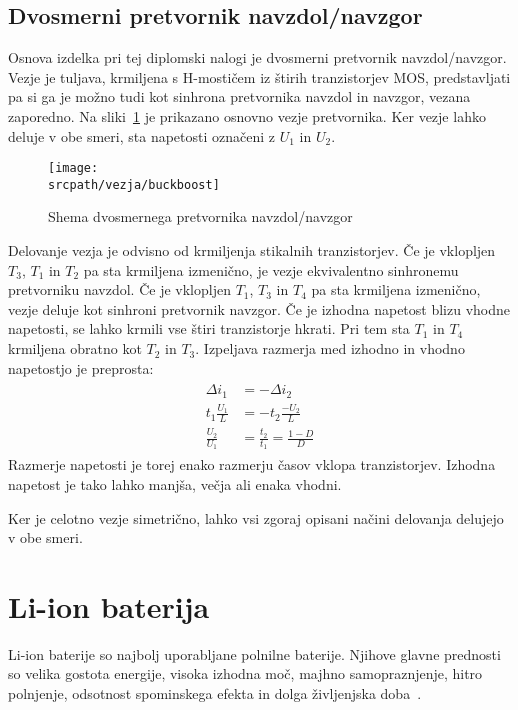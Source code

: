 \documentclass[a4paper,twoside,openright,12pt,slovene]{book}
\newcommand{\srcpath}{res_dark}
\newcommand{\srcpath}{res}
\begin{document}
\section{Dvosmerni pretvornik navzdol/navzgor} \label{sec:dvosmerni_pretvornik_navzdol_navzgor}
Osnova izdelka pri tej diplomski nalogi je dvosmerni pretvornik navzdol/navzgor.
Vezje je tuljava, krmiljena s H-mostičem iz štirih tranzistorjev MOS,
predstavljati pa si ga je možno tudi kot sinhrona pretvornika navzdol in navzgor, vezana zaporedno.
Na sliki~\ref{fig:osnovno_vezje_pretvornika} je prikazano osnovno vezje pretvornika.
Ker vezje lahko deluje v obe smeri, sta napetosti označeni z $U_1$ in $U_2$.
\begin{figure}[H]
    \centering
    \texttt{[image: \\srcpath/vezja/buckboost]}
    \caption{\label{fig:osnovno_vezje_pretvornika} Shema dvosmernega pretvornika navzdol/navzgor}
\end{figure}

Delovanje vezja je odvisno od krmiljenja stikalnih tranzistorjev.
Če je vklopljen $T_3$, $T_1$ in $T_2$ pa sta krmiljena izmenično, je vezje ekvivalentno sinhronemu pretvorniku navzdol.
Če je vklopljen $T_1$, $T_3$ in $T_4$ pa sta krmiljena izmenično, vezje deluje kot sinhroni pretvornik navzgor.
Če je izhodna napetost blizu vhodne napetosti, se lahko krmili vse štiri tranzistorje hkrati.
Pri tem sta $T_1$ in $T_4$ krmiljena obratno kot $T_2$ in $T_3$.
Izpeljava razmerja med izhodno in vhodno napetostjo je preprosta:
\begin{align}
    \begin{split}
        \Delta i_1 & = -\Delta i_2 \\
        t_1 \frac{U_1}{L} & = -t_2 \frac{-U_2}{L} \\
        \frac{U_2}{U_1} & = \frac{t_2}{t_1} = \frac{1-D}{D}
    \end{split}
\end{align}
Razmerje napetosti je torej enako razmerju časov vklopa tranzistorjev.
Izhodna napetost je tako lahko manjša, večja ali enaka vhodni.

Ker je celotno vezje simetrično, lahko vsi zgoraj opisani načini delovanja delujejo v obe smeri.

\chapter{Li-ion baterija} \label{ch:li_ion_baterija}
Li-ion baterije so najbolj uporabljane polnilne baterije.
Njihove glavne prednosti so velika gostota energije, visoka izhodna moč, majhno samopraznjenje, hitro polnjenje,
odsotnost spominskega efekta in dolga življenjska doba~\cite{wu_lithium-ion_2015}.
\end{document}
